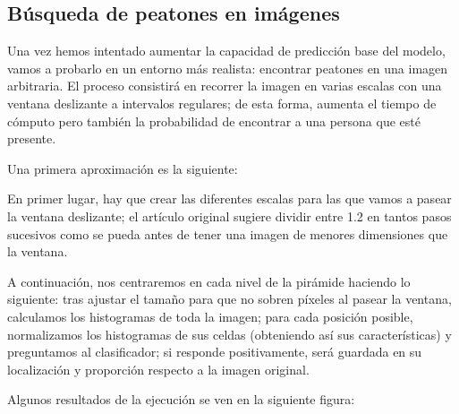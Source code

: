 \documentclass[11pt,a4paper]{article}
\begin{document}
        \subsection{Búsqueda de peatones en imágenes}

            \par
            Una vez hemos intentado aumentar la capacidad de predicción base del modelo, vamos a probarlo en un entorno más realista: encontrar peatones en una imagen arbitraria. El proceso consistirá en recorrer la imagen en varias escalas con una ventana deslizante a intervalos regulares; de esta forma, aumenta el tiempo de cómputo pero también la probabilidad de encontrar a una persona que esté presente.

            \par
            Una primera aproximación es la siguiente:


            \par
            En primer lugar, hay que crear las diferentes escalas para las que vamos a pasear la ventana deslizante; el artículo original sugiere dividir entre 1.2 en tantos pasos sucesivos como se pueda antes de tener una imagen de menores dimensiones que la ventana.

            \par
            A continuación, nos centraremos en cada nivel de la pirámide haciendo lo siguiente: tras ajustar el tamaño para que no sobren píxeles al pasear la ventana, calculamos los histogramas de toda la imagen; para cada posición posible, normalizamos los histogramas de sus celdas (obteniendo así sus características) y preguntamos al clasificador; si responde positivamente, será guardada en su localización y proporción respecto a la imagen original.

            \par
            Algunos resultados de la ejecución se ven en la siguiente figura:

            \vspace{0.3cm}
\end{document}
